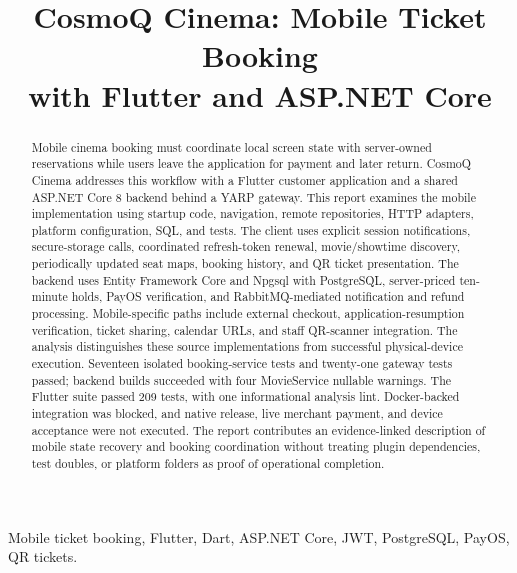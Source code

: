 \documentclass[conference]{IEEEtran}
\begin{document}
\title{CosmoQ Cinema: Mobile Ticket Booking\\with Flutter and ASP.NET Core}
\author{
}
\maketitle
\begin{abstract}
Mobile cinema booking must coordinate local screen state with server-owned
reservations while users leave the application for payment and later return.
CosmoQ Cinema addresses this workflow with a Flutter customer application and
a shared ASP.NET Core 8 backend behind a YARP gateway. This report examines
the mobile implementation using startup code, navigation, remote repositories,
HTTP adapters, platform configuration, SQL, and tests. The client uses explicit
session notifications, secure-storage calls, coordinated refresh-token renewal,
movie/showtime discovery, periodically updated seat maps, booking history,
and QR ticket presentation. The backend uses Entity Framework Core and Npgsql
with PostgreSQL, server-priced ten-minute holds, PayOS verification, and
RabbitMQ-mediated notification and refund processing. Mobile-specific paths
include external checkout, application-resumption verification, ticket sharing,
calendar URLs, and staff QR-scanner integration. The analysis distinguishes
these source implementations from successful physical-device execution.
Seventeen isolated booking-service tests and twenty-one gateway tests passed;
backend builds succeeded with four MovieService nullable warnings. The Flutter suite passed 209 tests, with one informational analysis lint.
Docker-backed integration was blocked, and native release, live merchant payment, and device
acceptance were not executed. The report contributes an evidence-linked
description of mobile state recovery and booking coordination without treating
plugin dependencies, test doubles, or platform folders as proof of operational
completion.
\end{abstract}
\begin{IEEEkeywords}
Mobile ticket booking, Flutter, Dart, ASP.NET Core, JWT, PostgreSQL, PayOS, QR tickets.
\end{IEEEkeywords}
\end{document}
